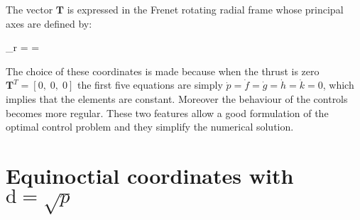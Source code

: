 \documentclass[12pt]{article}
\begin{document}
The vector $\bm{T}$ is expressed in the Frenet rotating radial
frame whose principal axes are defined by:
\begin{EQ}
  _{r} = 
   = 
\end{EQ}
The choice of these coordinates is made because when the thrust is zero $\textbf{T}^{T} = [ 0, \; 0, \; 0 ]$ the first five equations are simply $\dot{p} = \dot{f} = \dot{g} = \dot{h} = \dot{k} = 0$, which implies that the elements are constant. Moreover the behaviour of the controls becomes more regular. These two features allow a good formulation of the optimal control problem and they simplify the numerical solution.


\newcommand{\SP}{\mathrm{d}}
\section{Equinoctial coordinates with $\SP=\sqrt{p}$}
\end{document}
